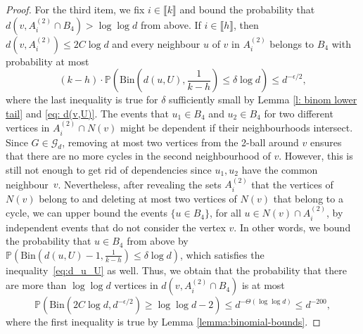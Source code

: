 \documentclass[notitlepage]{scrartcl}
\newcommand{\br}[1]{\llbracket{#1}\rrbracket}
\renewcommand{\Pr}{\mathbb{P}}
\begin{document}
\begin{proof}
    
        For the third item, we fix $i \in \br{k}$ and bound the probability that $d(v, A_i^{(2)} \cap B_4)> \log \log d$ from above. If $i \in \br{h}$, then $d(v, A_i^{(2)}) \le 2C \log d$ and every neighbour $u$ of $v$ in $A_i^{(2)}$ belongs to $B_4$ with probability at most
    \begin{equation}
        (k-h) \cdot \Pr\left(\text{Bin}\left(d(u, U), \frac{1}{k-h}\right) \le \delta \log d\right) \le d^{-\epsilon/2},
    \label{eq:d_u_U}
    \end{equation}
    where the last inequality is true for $\delta$ sufficiently small by Lemma \ref{l: binom lower tail} and \eqref{eq: d(v,U)}. The events that $u_1 \in B_4$ and $u_2 \in B_4$ for two different vertices in $A_i^{(2)} \cap N(v)$ might be dependent if their neighbourhoods intersect. Since $G \in \mathcal{G}_d$, removing at most two vertices from the 2-ball around $v$ ensures that there are no more cycles in the second neighbourhood of $v$. However, this is still not enough to get rid of dependencies since $u_1,u_2$ have the common neighbour~$v$. Nevertheless, after revealing the sets $A_i^{(2)}$ that the vertices of $N(v)$ belong to and deleting at most two vertices of $N(v)$ that belong to a cycle, we can upper bound the events $\{u\in B_4\}$, for all $u\in N(v)\cap A_i^{(2)}$, by independent events that do not consider the vertex $v$. In other words, we bound the probability that $u\in B_4$ from above by $\mathbb{P}\left(\text{Bin}\left(d(u, U)-1, \frac{1}{k-h}\right) \le \delta \log d\right)$, which satisfies the inequality~\eqref{eq:d_u_U} as well. Thus, we obtain that the probability that there are more than $\log \log d$ vertices in $d(v, A_i^{(2)} \cap B_4)$ is at most
    \[
        \Pr\left(\text{Bin}\left(2C \log d, d^{-\epsilon/2}\right) \ge \log \log d - 2\right) \le d^{-\Theta(\log \log d)} \le d^{-200},
    \]
    where the first inequality is true by Lemma \ref{lemma:binomial-bounds}. 
    

\end{proof}
\end{document}
